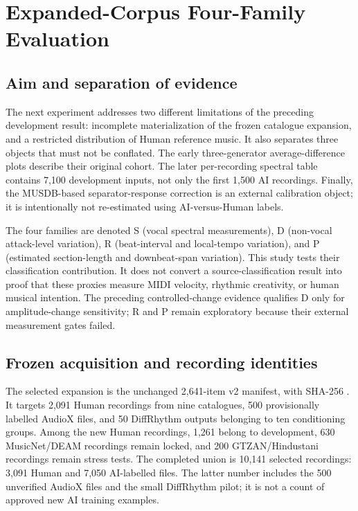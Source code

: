 \section{Expanded-Corpus Four-Family Evaluation}
\label{sec:expanded-materialized}
\providecommand{\ExpandedRoot}{../../source_diversity_expansion_20260905}

\subsection{Aim and separation of evidence}

The next experiment addresses two different limitations of the preceding
development result: incomplete materialization of the frozen catalogue expansion,
and a restricted distribution of Human reference music. It also separates three
objects that must not be conflated. The early three-generator average-difference
plots describe their original cohort. The later per-recording spectral table
contains 7,100 development inputs, not only the first 1,500 AI recordings. Finally,
the MUSDB-based separator-response correction is an external calibration object;
it is intentionally not re-estimated using AI-versus-Human labels.

The four families are denoted S (vocal spectral measurements), D (non-vocal
attack-level variation), R (beat-interval and local-tempo variation), and P
(estimated section-length and downbeat-span variation). This study tests their
classification contribution. It does not convert a source-classification result
into proof that these proxies measure MIDI velocity, rhythmic creativity, or
human musical intention. The preceding controlled-change evidence qualifies D
only for amplitude-change sensitivity; R and P remain exploratory because their
external measurement gates failed.

\subsection{Frozen acquisition and recording identities}

The selected expansion is the unchanged 2,641-item v2 manifest, with SHA-256
.
It targets 2,091 Human recordings from nine catalogues, 500 provisionally labelled
AudioX files, and 50 DiffRhythm outputs belonging to ten conditioning groups.
Among the new Human recordings, 1,261 belong to development, 630 MusicNet/DEAM
recordings remain locked, and 200 GTZAN/Hindustani recordings remain stress tests.
The completed union is 10,141 selected recordings: 3,091 Human and 7,050
AI-labelled files. The latter number includes the 500 unverified AudioX files and
the small DiffRhythm pilot; it is not a count of approved new AI training examples.


